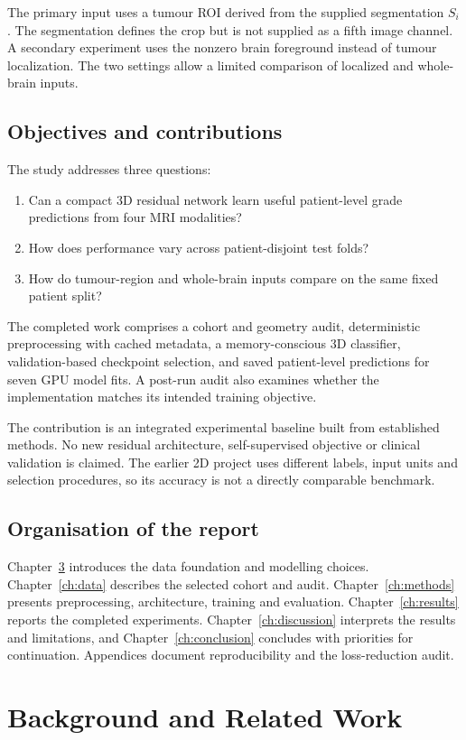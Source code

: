 \documentclass[12pt,a4paper,oneside]{report}
\begin{document}
The primary input uses a tumour ROI derived from the supplied segmentation $S_i$. The segmentation defines the crop but is not supplied as a fifth image channel. A secondary experiment uses the nonzero brain foreground instead of tumour localization. The two settings allow a limited comparison of localized and whole-brain inputs.

\section{Objectives and contributions}
The study addresses three questions:
\begin{enumerate}
\item Can a compact 3D residual network learn useful patient-level grade predictions from four MRI modalities?
\item How does performance vary across patient-disjoint test folds?
\item How do tumour-region and whole-brain inputs compare on the same fixed patient split?
\end{enumerate}
The completed work comprises a cohort and geometry audit, deterministic preprocessing with cached metadata, a memory-conscious 3D classifier, validation-based checkpoint selection, and saved patient-level predictions for seven GPU model fits. A post-run audit also examines whether the implementation matches its intended training objective.

The contribution is an integrated experimental baseline built from established methods. No new residual architecture, self-supervised objective or clinical validation is claimed. The earlier 2D project uses different labels, input units and selection procedures, so its accuracy is not a directly comparable benchmark.

\section{Organisation of the report}
Chapter~\ref{ch:background} introduces the data foundation and modelling choices. Chapter~\ref{ch:data} describes the selected cohort and audit. Chapter~\ref{ch:methods} presents preprocessing, architecture, training and evaluation. Chapter~\ref{ch:results} reports the completed experiments. Chapter~\ref{ch:discussion} interprets the results and limitations, and Chapter~\ref{ch:conclusion} concludes with priorities for continuation. Appendices document reproducibility and the loss-reduction audit.

\chapter{Background and Related Work}
\label{ch:background}
\end{document}
